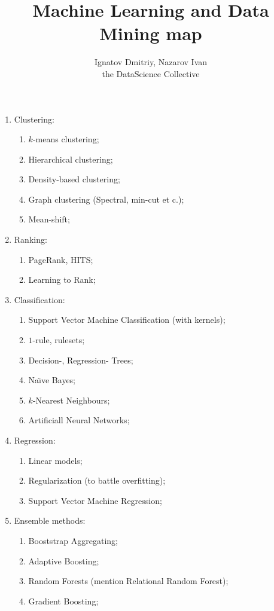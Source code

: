 \documentclass[a4paper]{article}
\title{Machine Learning and Data Mining map}
\author{Ignatov Dmitriy, Nazarov Ivan \rus{101мНОД(ИССА)}\\the DataScience Collective}
\begin{document}
\maketitle

\begin{enumerate}
	\item Clustering: \begin{enumerate}
    \item $k$-means clustering;
    \item Hierarchical clustering;
    \item Density-based clustering;
    \item Graph clustering (Spectral, min-cut et c.);
    \item Mean-shift;
  \end{enumerate}
  \item Ranking: \begin{enumerate}
    \item PageRank, HITS;
    \item Learning to Rank;
  \end{enumerate}
  \item Classification: \begin{enumerate}
    \item Support Vector Machine Classification (with kernels);
    \item $1$-rule, rulesets;
    \item Decision-, Regression- Trees;
    \item Na\"\i ve Bayes;
    \item $k$-Nearest Neighbours;
    \item Artificiall Neural Networks;
  \end{enumerate}
  \item Regression: \begin{enumerate}
    \item Linear models;
    \item Regularization (to battle overfitting);
    \item Support Vector Machine Regression;
  \end{enumerate}
  \item Ensemble methods: \begin{enumerate}
    \item Booststrap Aggregating;
    \item Adaptive Boosting;
    \item Random Forests (mention Relational Random Forest);
    \item Gradient Boosting;

\end{enumerate}
\end{enumerate}
\end{document}
